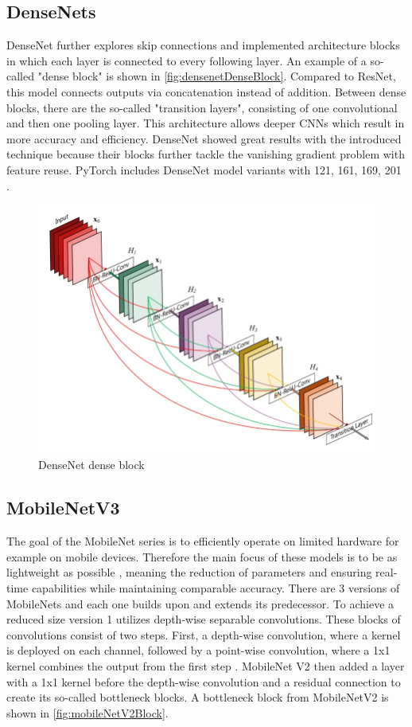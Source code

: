 \subsection{DenseNets}

DenseNet \cite{DenseNets} further explores skip connections and implemented architecture blocks in which each layer is connected to every following layer.
An example of a so-called "dense block" is shown in \autoref{fig:densenetDenseBlock}.
Compared to ResNet, this model connects outputs via concatenation instead of addition.
Between dense blocks, there are the so-called "transition layers", consisting of one convolutional and then one pooling layer.
This architecture allows deeper \ac{CNN}s which result in more accuracy and efficiency.
DenseNet showed great results with the introduced technique because their blocks further tackle the vanishing gradient problem with feature reuse.
PyTorch includes DenseNet model variants with 121, 161, 169, 201 \cite{pytorchdensenet}.

\begin{figure}[H]
    \centering
    \includegraphics[width=0.6\linewidth]{PICs/backbones/densenet_denseBlock.jpg}
    \caption{DenseNet dense block \cite{DenseNets}}
    \label{fig:densenetDenseBlock}
\end{figure}

\vspace{0.5cm}

\subsection{MobileNetV3}

The goal of the MobileNet series \cite{MobileNetV3} is to efficiently operate on limited hardware for example on mobile devices.
Therefore the main focus of these models is to be as lightweight as possible \cite{networkArchitectureSurvey}, meaning the reduction of parameters and ensuring real-time capabilities while maintaining comparable accuracy.
There are 3 versions of MobileNets and each one builds upon and extends its predecessor.
To achieve a reduced size version 1 utilizes depth-wise separable convolutions.
These blocks of convolutions consist of two steps. First, a depth-wise convolution, where a kernel is deployed on each channel, followed by a point-wise convolution, where a 1x1 kernel combines the output from the first step \cite{networkArchitectureSurvey}.
MobileNet V2 then added a layer with a 1x1 kernel before the depth-wise convolution and a residual connection to create its so-called bottleneck blocks.
A bottleneck block from MobileNetV2 is shown in \autoref{fig:mobileNetV2Block}.

